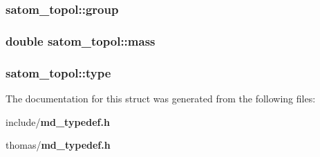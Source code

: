 \subsubsection{ {\bf satom\_\-topol::group}}\label{structsatom__topol_3f9b91da46e7df2fcd381af0ec6c22b8}


\subsubsection{\setlength{\rightskip}{0pt plus 5cm}double {\bf satom\_\-topol::mass}}\label{structsatom__topol_20312e9834960cd518e687e31dc85078}


\subsubsection{ {\bf satom\_\-topol::type}}\label{structsatom__topol_ed7788eac5fd4a7de982d2ab6f5d7721}




The documentation for this struct was generated from the following files:\begin{CompactItemize}
\item 
include/{\bf md\_\-typedef.h}\item 
thomas/{\bf md\_\-typedef.h}\end{CompactItemize}
